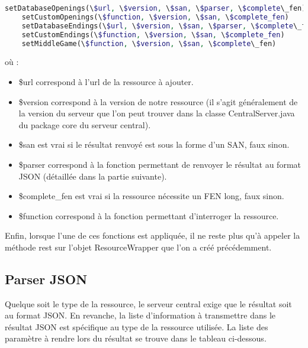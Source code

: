 \documentclass[a4paper,11pt]{article}
\begin{document}
\lstset{xleftmargin =-2.2cm}
\begin{lstlisting}[language=php]
	setDatabaseOpenings(\$url, \$version, \$san, \$parser, \$complete\_fen)
	setCustomOpenings(\$function, \$version, \$san, \$complete_fen)
	setDatabaseEndings(\$url, \$version, \$san, \$parser, \$complete\_fen)
	setCustomEndings(\$function, \$version, \$san, \$complete_fen)
	setMiddleGame(\$function, \$version, \$san, \$complete\_fen)
\end{lstlisting}
	
où :

\begin{itemize}
	\item \$url correspond à l'url de la ressource à ajouter.
	\item \$version correspond à la version de notre ressource (il s'agit généralement de la version du serveur que l'on peut trouver dans la classe CentralServer.java du package core du serveur central).
	\item \$san est vrai si le résultat renvoyé est sous la forme d'un SAN, faux sinon.
	\item \$parser correspond à la fonction permettant de renvoyer le résultat au format JSON (détaillée dans la partie suivante).
	\item \$complete\_fen est vrai si la ressource nécessite un FEN long, faux sinon.
	\item \$function correspond à la fonction permettant d'interroger la ressource. 
\end{itemize}
Enfin, lorsque l'une de ces fonctions est appliquée, il ne reste plus qu'à appeler la méthode rest sur l'objet ResourceWrapper que l'on a créé précédemment.
	
\subsection{Parser JSON}
Quelque soit le type de la ressource, le serveur central exige que le résultat soit au format JSON. En revanche, la liste d'information à transmettre dans le résultat JSON est spécifique au type de la ressource utilisée. La liste des paramètre à rendre lors du résultat se trouve dans le tableau ci-dessous.
\end{document}
